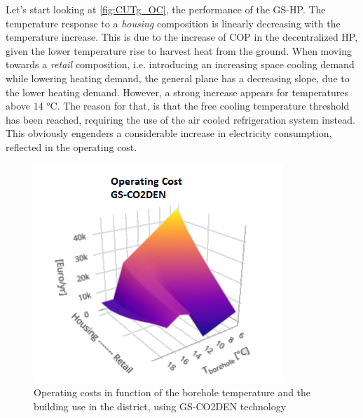 \documentclass{article}
\begin{document}
Let's start looking at \ref{fig:CUTg_OC}, the performance of the GS-HP. The temperature response to a \textit{housing} composition is linearly decreasing with the temperature increase. This is due to the increase of COP in the decentralized HP, given the lower temperature rise to harvest heat from the ground. When moving towards a \textit{retail} composition, i.e. introducing an increasing space cooling demand while lowering heating demand, the general plane has a decreasing slope, due to the lower heating demand. However, a strong increase appears for temperatures above 14 \si{\celsius}. The reason for that, is that the free cooling temperature threshold has been reached, requiring the use of the air cooled refrigeration system instead. This obviously engenders a considerable increase in electricity consumption, reflected in the operating cost.

\begin{figure}[htp]
	\centering
	\includegraphics[width=\textwidth]{CUTg_SA_CO2_OC.png}
	\caption{Operating costs in function of the borehole temperature and the building use in the district, using GS-CO2DEN technology}
	\label{fig:CUTg_CO2_OC}
\end{figure}
\end{document}
